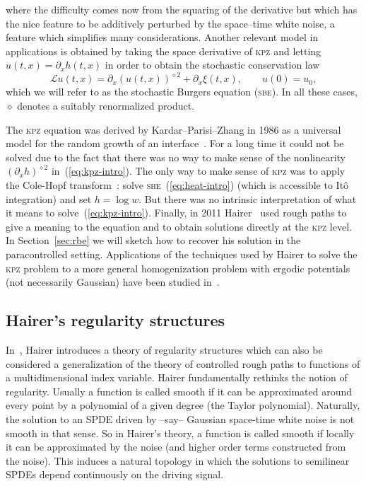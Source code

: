 \documentclass[a4paper,11pt]{article}
\newcommand{\tmname}[1]{\textsc{#1}}
\newcommand{\LL}{\mathscr{L}}
\newcommand{\renorm}{\,\mathord{\diamond}\,}
\begin{document}
where the difficulty comes now from the squaring of the derivative but which
has the nice feature to be additively perturbed by the space--time white
noise, a feature which simplifies many considerations. Another relevant model
in applications is obtained by taking the space derivative of {\tmname{kpz}}
and letting $u (t, x) = \partial_x h (t, x)$ in order to obtain the stochastic
conservation law
\begin{equation}
  \label{eq:burgers-intro} \LL u (t, x) = \partial_x (u (t, x))^{\renorm 2} +
  \partial_x \xi (t, x), \hspace{2em} u (0) = u_0,
\end{equation}
which we will refer to as the stochastic Burgers equation ({\tmname{sbe}}). In
all these cases, $\renorm$ denotes a suitably renormalized product.

The {\tmname{kpz}} equation was derived by Kardar--Parisi--Zhang in 1986 as a
universal model for the random growth of an interface~{\cite{Kardar1986}}. For
a long time it could not be solved due to the fact that there was no way to
make sense of the nonlinearity $(\partial_x h)^{\renorm 2}$
in~(\ref{eq:kpz-intro}). The only way to make sense of {\tmname{kpz}} was to
apply the Cole-Hopf transform~{\cite{Bertini1997}}: solve
{\tmname{she}}~(\ref{eq:heat-intro}) (which is accessible to It{\^o}
integration) and set $h = \log w$. But there was no intrinsic interpretation
of what it means to solve~(\ref{eq:kpz-intro}). Finally, in 2011
Hairer~{\cite{Hairer2013b}} used rough paths to give a meaning to the equation
and to obtain solutions directly at the {\tmname{kpz}} level. In
Section~\ref{sec:rbe} we will sketch how to recover his solution in the
paracontrolled setting. Applications of the techniques used by Hairer to solve
the {\tmname{kpz}} problem to a more general homogenization problem with
ergodic potentials (not necessarily Gaussian) have been studied
in~{\cite{hairer_random_2013}}.

\subsection{Hairer's regularity structures}

In~{\cite{Hairer2014}}, Hairer introduces a theory of regularity structures
which can also be considered a generalization of the theory of controlled
rough paths to functions of a multidimensional index variable. Hairer
fundamentally rethinks the notion of regularity. Usually a function is called
smooth if it can be approximated around every point by a polynomial of a given
degree (the Taylor polynomial). Naturally, the solution to an SPDE driven by
--say-- Gaussian space-time white noise is not smooth in that sense. So in
Hairer's theory, a function is called smooth if locally it can be approximated
by the noise (and higher order terms constructed from the noise). This induces
a natural topology in which the solutions to semilinear SPDEs depend
continuously on the driving signal.
\end{document}
